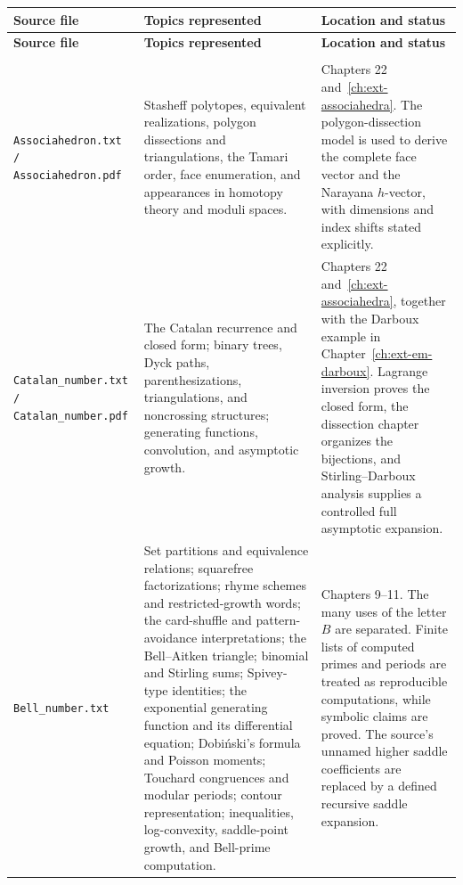 \documentclass[11pt,a4paper,oneside,openany]{book}
\theoremstyle{definition}
\theoremstyle{remark}
\begin{document}
\renewcommand{\arraystretch}{1.15}
\begin{longtable}{>{\raggedright\arraybackslash}p{}
                  >{\raggedright\arraybackslash}p{}
                  >{\raggedright\arraybackslash}p{}}
\toprule
\textbf{Source file} & \textbf{Topics represented} & \textbf{Location and status}\\
\midrule
\endfirsthead
\toprule
\textbf{Source file} & \textbf{Topics represented} & \textbf{Location and status}\\
\midrule
\endhead
\midrule
\multicolumn{3}{r}{\small Continued on the next page}\\
\endfoot
\bottomrule
\endlastfoot


\nolinkurl{Associahedron.txt / Associahedron.pdf}
& Stasheff polytopes, equivalent realizations, polygon dissections and
  triangulations, the Tamari order, face enumeration, and appearances in
  homotopy theory and moduli spaces.
& Chapters 22 and~\ref{ch:ext-associahedra}.  The polygon-dissection model is
  used to derive the complete face vector and the Narayana $h$-vector, with
  dimensions and index shifts stated explicitly.\\[1ex]

\nolinkurl{Catalan_number.txt / Catalan_number.pdf}
& The Catalan recurrence and closed form; binary trees, Dyck paths,
  parenthesizations, triangulations, and noncrossing structures; generating
  functions, convolution, and asymptotic growth.
& Chapters 22 and~\ref{ch:ext-associahedra}, together with the Darboux example
  in Chapter~\ref{ch:ext-em-darboux}.  Lagrange inversion proves the closed
  form, the dissection chapter organizes the bijections, and Stirling--Darboux
  analysis supplies a controlled full asymptotic expansion.\\[1ex]

\nolinkurl{Bell_number.txt}
& Set partitions and equivalence relations; squarefree factorizations; rhyme
  schemes and restricted-growth words; the card-shuffle and pattern-avoidance
  interpretations; the Bell--Aitken triangle; binomial and Stirling sums;
  Spivey-type identities; the exponential generating function and its
  differential equation; Dobiński's formula and Poisson moments; Touchard
  congruences and modular periods; contour representation; inequalities,
  log-convexity, saddle-point growth, and Bell-prime computation.
& Chapters 9--11.  The many uses of the letter $B$ are separated.  Finite lists
  of computed primes and periods are treated as reproducible computations, while
  symbolic claims are proved.  The source's unnamed higher saddle coefficients
  are replaced by a defined recursive saddle expansion.\\[1ex]


\end{longtable}
\end{document}
